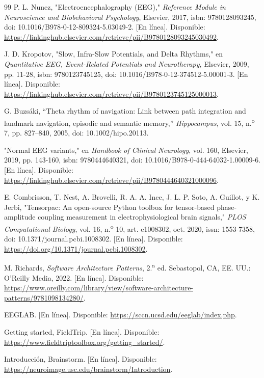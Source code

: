 \documentclass[12pt,letterpaper,oneside]{article}
\begin{document}
\begin{thebibliography}{99}
 P. L. Nunez, "Electroencephalography (EEG)," \textit{Reference Module in Neuroscience and Biobehavioral Psychology}, Elsevier, 2017, isbn: 9780128093245, doi: 10.1016/B978-0-12-809324-5.03049-2. [En línea]. Disponible: \url{https://linkinghub.elsevier.com/retrieve/pii/B9780128093245030492}.

 J. D. Kropotov, "Slow, Infra-Slow Potentials, and Delta Rhythms," en \textit{Quantitative EEG, Event-Related Potentials and Neurotherapy}, Elsevier, 2009, pp. 11-28, isbn: 9780123745125, doi: 10.1016/B978-0-12-374512-5.00001-3. [En línea]. Disponible: \url{https://linkinghub.elsevier.com/retrieve/pii/B9780123745125000013}.

 G. Buzsáki, ``Theta rhythm of navigation: Link between path integration and landmark navigation, episodic and semantic memory,'' \textit{Hippocampus}, vol. 15, n.\textsuperscript{o} 7, pp. 827--840, 2005, doi: 10.1002/hipo.20113.

 "Normal EEG variants," en \textit{Handbook of Clinical Neurology}, vol. 160, Elsevier, 2019, pp. 143-160, isbn: 9780444640321, doi: 10.1016/B978-0-444-64032-1.00009-6. [En línea]. Disponible: \url{https://linkinghub.elsevier.com/retrieve/pii/B9780444640321000096}.

 E. Combrisson, T. Nest, A. Brovelli, R. A. A. Ince, J. L. P. Soto, A. Guillot, y K. Jerbi, "Tensorpac: An open-source Python toolbox for tensor-based phase-amplitude coupling measurement in electrophysiological brain signals," \textit{PLOS Computational Biology}, vol. 16, n.\textsuperscript{o} 10, art. e1008302, oct. 2020, issn: 1553-7358, doi: 10.1371/journal.pcbi.1008302. [En línea]. Disponible: \url{https://doi.org/10.1371/journal.pcbi.1008302}.

 M. Richards, \textit{Software Architecture Patterns}, 2.\textsuperscript{a} ed. Sebastopol, CA, EE. UU.: O'Reilly Media, 2022. [En línea]. Disponible: \url{https://www.oreilly.com/library/view/software-architecture-patterns/9781098134280/}.

 EEGLAB. [En línea]. Disponible: \url{https://sccn.ucsd.edu/eeglab/index.php}.

 Getting started, FieldTrip. [En línea]. Disponible: \url{https://www.fieldtriptoolbox.org/getting_started/}.

 Introducción, Brainstorm. [En línea]. Disponible: \url{https://neuroimage.usc.edu/brainstorm/Introduction}.


\end{thebibliography}
\end{document}
